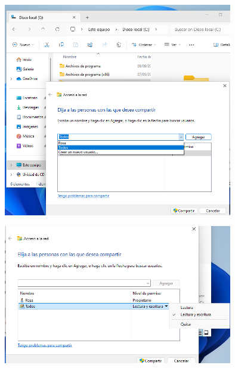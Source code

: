 \documentclass[
  a4paper,
]{article}
\begin{document}
\includegraphics[width=0.75\textwidth,height=\textheight]{png/compartir2.png}

\includegraphics[width=0.75\textwidth,height=\textheight]{png/compartir3.png}
\end{document}
